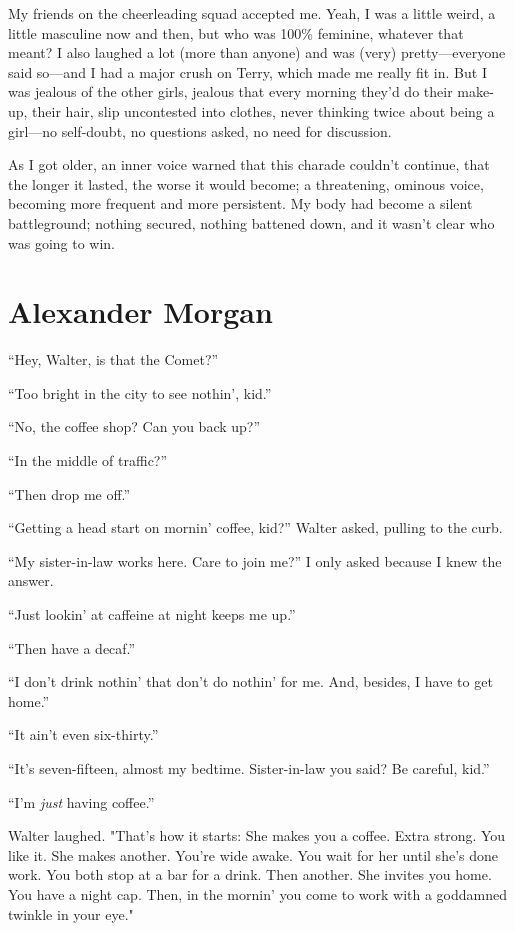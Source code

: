 My friends on the cheerleading squad accepted me. Yeah, I was a little
weird, a little masculine now and then, but who was 100\% feminine,
whatever that meant? I also laughed a lot (more than anyone) and was
(very) pretty---everyone said so---and I had a major crush on Terry,
which made me really fit in. But I was jealous of the other girls,
jealous that every morning they'd do their make-up, their hair, slip
uncontested into clothes, never thinking twice about being a girl---no
self-doubt, no questions asked, no need for discussion.

As I got older, an inner voice warned that this charade couldn't
continue, that the longer it lasted, the worse it would become; a
threatening, ominous voice, becoming more frequent and more persistent.
My body had become a silent battleground; nothing secured, nothing
battened down, and it wasn't clear who was going to win.

\chapter{Alexander Morgan}

\titlemark

``\hspace{\parindent}Hey, Walter, is that the Comet?''

``Too bright in the city to see nothin', kid.''

``No, the coffee shop? Can you back up?''

``In the middle of traffic?''

``Then drop me off.''

``Getting a head start on mornin' coffee, kid?'' Walter asked, pulling
to the curb.

``My sister-in-law works here. Care to join me?'' I only asked because I
knew the answer.

``Just lookin' at caffeine at night keeps me up.''

``Then have a decaf.''

``I don't drink nothin' that don't do nothin' for me. And, besides, I
have to get home.''

``It ain't even six-thirty.''

``It's seven-fifteen, almost my bedtime. Sister-in-law you said? Be
careful, kid.''

``I'm \emph{just} having coffee.''

Walter laughed. "That's how it starts: She makes you a coffee. Extra
strong. You like it. She makes another. You're wide awake. You wait for
her until she's done work. You both stop at a bar for a drink. Then
another. She invites you home. You have a night cap. Then, in the
mornin' you come to work with a goddamned twinkle in your eye."

